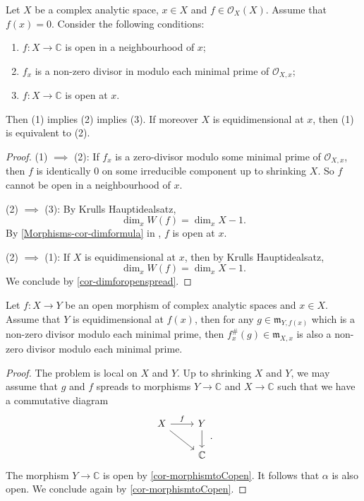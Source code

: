 \begin{corollary}\label{cor-morphismtoCopen}
    Let $X$ be a complex analytic space, $x\in X$ and $f\in \mathcal{O}_X(X)$. Assume that $f(x)=0$. Consider the following conditions:
    \begin{enumerate}
        \item $f:X\rightarrow \mathbb{C}$ is open in a neighbourhood of $x$;
        \item $f_x$ is a non-zero divisor in modulo each minimal prime of $\mathcal{O}_{X,x}$;
        \item $f:X\rightarrow \mathbb{C}$ is open at $x$.
    \end{enumerate}
    Then (1) implies (2) implies (3). If moreover $X$ is equidimensional at $x$, then (1) is equivalent to (2).
\end{corollary}
\begin{proof}
    (1) $\implies$ (2): If $f_x$ is a zero-divisor modulo some minimal prime of $\mathcal{O}_{X,x}$, then $f$ is identically $0$ on some irreducible component up to shrinking $X$. So $f$ cannot be open in a neighbourhood of $x$.

    (2) $\implies$ (3): By Krulls Hauptidealsatz, 
    \[
        \dim_x W(f)=\dim_x X-1.  
    \]
    By \cref{Morphisms-cor-dimformula}  in , $f$ is open at $x$. 

    (2) $\implies$ (1):
    If $X$ is equidimensional at $x$, then by Krulls Hauptidealsatz, 
    \[
        \dim_x W(f)=\dim_x X-1.  
    \]
    We conclude by \cref{cor-dimforopenspread}.
\end{proof}
\begin{corollary}\label{cor-pullbackactiveactive}
    Let $f:X\rightarrow Y$ be an open morphism of complex analytic spaces and $x\in X$. Assume that $Y$ is equidimensional at $f(x)$, then for any $g\in \mathfrak{m}_{Y,f(x)}$ which is a non-zero divisor modulo each minimal prime, then $f_x^{\#}(g)\in \mathfrak{m}_{X,x}$ is also a non-zero divisor modulo each minimal prime.
\end{corollary}
\begin{proof}
    The problem is local on $X$ and $Y$. Up to shrinking $X$ and $Y$, we may assume that $g$ and $f$ spreads to morphisms $Y\rightarrow \mathbb{C}$ and $X\rightarrow \mathbb{C}$ such that we have a commutative diagram
    \[
        \begin{tikzcd}
            X \arrow[r, "f"] \arrow[rd] & Y \arrow[d] \\
                                        & \mathbb{C} 
        \end{tikzcd}.  
    \]
    The morphism $Y\rightarrow \mathbb{C}$ is open by \cref{cor-morphismtoCopen}. It follows that $\alpha$ is also open. We conclude again by \cref{cor-morphismtoCopen}.
\end{proof}

